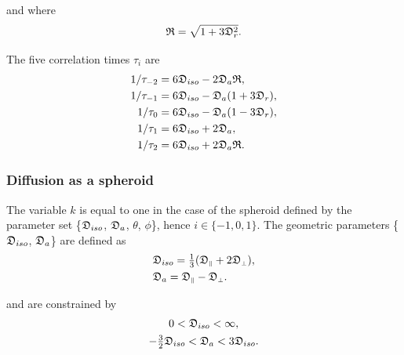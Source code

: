 \noindent and where
\begin{equation}
    \mathfrak{R} = \sqrt{1 + 3\mathfrak{D}_r^2}.
\end{equation}


The five correlation times $\tau_i$ are
\begin{subequations}
\begin{align}
    1/\tau_{-2} &= 6 \mathfrak{D}_{iso} - 2\mathfrak{D}_a\mathfrak{R},   \label{eq: ellipsoid tau-2} \\
    1/\tau_{-1} &= 6 \mathfrak{D}_{iso} - \mathfrak{D}_a (1 + 3\mathfrak{D}_r), \label{eq: ellipsoid tau-1} \\
    1/\tau_{0}  &= 6 \mathfrak{D}_{iso} - \mathfrak{D}_a (1 - 3\mathfrak{D}_r), \label{eq: ellipsoid tau0} \\
    1/\tau_{1}  &= 6 \mathfrak{D}_{iso} + 2\mathfrak{D}_a,               \label{eq: ellipsoid tau1} \\
    1/\tau_{2}  &= 6 \mathfrak{D}_{iso} + 2\mathfrak{D}_a\mathfrak{R}.   \label{eq: ellipsoid tau2}
\end{align}
\end{subequations}



\subsubsection{Diffusion as a spheroid}

The variable $k$ is equal to one in the case of the spheroid defined by the parameter set \{$\mathfrak{D}_{iso}$, $\mathfrak{D}_a$, $\theta$, $\phi$\}, hence $i \in \{-1, 0, 1\}$.
The geometric parameters \{$\mathfrak{D}_{iso}$, $\mathfrak{D}_a$\} are defined as
\begin{subequations}
\begin{align}
    & \mathfrak{D}_{iso} = \tfrac{1}{3} (\mathfrak{D}_{\scriptscriptstyle \parallel} + 2\mathfrak{D}_{\scriptscriptstyle \perp}),   \label{eq: Diso spheroid def} \\
    & \mathfrak{D}_a = \mathfrak{D}_{\scriptscriptstyle \parallel} - \mathfrak{D}_{\scriptscriptstyle \perp}.                       \label{eq: Da spheroid def}
\end{align}
\end{subequations}

\noindent and are constrained by
\begin{subequations}
\begin{gather}
    0 < \mathfrak{D}_{iso} < \infty, \\
    -\tfrac{3}{2} \mathfrak{D}_{iso} < \mathfrak{D}_a < 3\mathfrak{D}_{iso}.
\end{gather}
\end{subequations}

